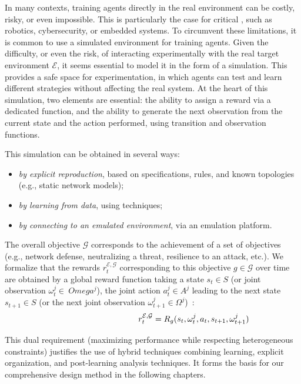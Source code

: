 In many contexts, training agents directly in the real environment can be costly, risky, or even impossible. This is particularly the case for critical , such as robotics, cybersecurity, or embedded systems. To circumvent these limitations, it is common to use a simulated environment for training agents. Given the difficulty, or even the risk, of interacting experimentally with the real target environment $\mathcal {E}$, it seems essential to model it in the form of a simulation. This provides a safe space for experimentation, in which agents can test and learn different strategies without affecting the real system. At the heart of this simulation, two elements are essential: the ability to assign a reward via a dedicated function, and the ability to generate the next observation from the current state and the action performed, using transition and observation functions.


This simulation can be obtained in several ways:
\begin{itemize}
  \item \emph{by explicit reproduction}, based on specifications, rules, and known topologies (e.g., static network models);
  \item \emph{by learning from data}, using  techniques;
  \item \emph{by connecting to an emulated environment}, via an emulation platform.
\end{itemize}

\noindent The overall objective $\mathcal{G}$ corresponds to the achievement of a set of objectives (e.g., network defense, neutralizing a threat, resilience to an attack, etc.). We formalize that the rewards $r^{\mathcal{E}, \mathcal{G}}_t$ corresponding to this objective $g \in \mathcal{G}$ over time are obtained by a global reward function taking a state $s_t \in S$ (or joint observation $\omega^j_t \in \ Omega^j$), the joint action $a^j_t \in A^j$ leading to the next state $s_{t+1} \in S$ (or the next joint observation $\omega^j_{t+1} \in \Omega^j$)~:
%
\[
  \hspace{3.5cm}r^{\mathcal{E}, \mathcal{G}}_t = R_{g}(s_t, \omega^j_t, a_t, s_{t+1}, \omega^j_{t+1})
\]

\noindent
This dual requirement (maximizing performance while respecting heterogeneous constraints) justifies the use of hybrid techniques combining learning, explicit organization, and post-learning analysis techniques. It forms the basis for our comprehensive design method in the following chapters.


